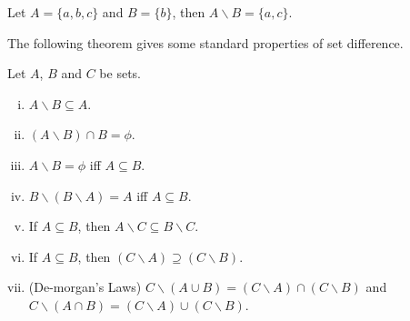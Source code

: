 \documentclass[a4paper,english,12pt]{article}
\begin{document}
\begin{exmp}
Let $A = \{a, b, c\}$ and $B = \{b \}$, then $A \backslash B = \{a, c\}$. 
\end{exmp}

The following theorem gives some standard properties of set difference.
\begin{thm}
 Let $A$, $B$ and $C$ be sets.
 \begin{enumerate}[i)]
  \item $A \backslash B \subseteq A$.
  \item $(A \backslash B) \cap B = \phi$.
  \item $A \backslash B = \phi$ iff $A \subseteq B$.
  \item $B \backslash (B \backslash A) = A$ iff $A \subseteq B$.
  \item If $A \subseteq B$, then $A \backslash C \subseteq B \backslash C$.
  \item If $A \subseteq B$, then $(C \backslash A) \supseteq (C \backslash B)$.
  \item (De-morgan's Laws) $C \backslash (A \cup B) = (C \backslash A) \cap (C \backslash B)$ and $C \backslash (A \cap B) = (C \backslash A) \cup (C \backslash B)$.
 \end{enumerate}
\end{thm}
\end{document}
